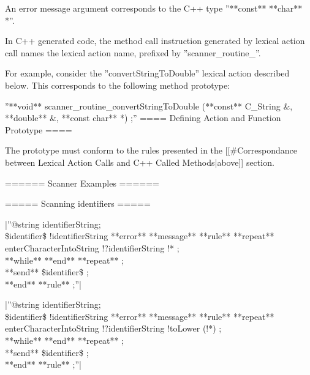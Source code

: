 An error message argument corresponds to the C++ type ''**const** **char** *''.

In C++ generated code, the method call instruction generated by lexical action call names the lexical action name, prefixed by ''scanner\_routine\_''.

For example, consider the ''convertStringToDouble'' lexical action described below. This corresponds to the following method prototype:

''**void** scanner\_routine\_convertStringToDouble (**const** C\_String \&, **double** \&, **const char** *) ;''
==== Defining Action and Function Prototype ====

The prototype must conform to the rules presented in the [[\#Correspondance between Lexical Action Calls and C++ Called Methods|above]] section.


====== Scanner Examples ======

===== Scanning identifiers =====

|''@string identifierString;\\ 
\$identifier\$ !identifierString **error** **message** %
**rule** %
 **repeat**\\ 
  enterCharacterIntoString !?identifierString !* ;\\ 
 **while** %
 **end** **repeat** ;\\ 
 **send** \$identifier\$ ;\\
**end** **rule** ;''|

|''@string identifierString;\\ 
\$identifier\$ !identifierString **error** **message** %
**rule** %
 **repeat**\\ 
  enterCharacterIntoString !?identifierString !toLower (!*) ;\\ 
 **while** %
 **end** **repeat** ;\\ 
 **send** \$identifier\$ ;\\
**end** **rule** ;''|

